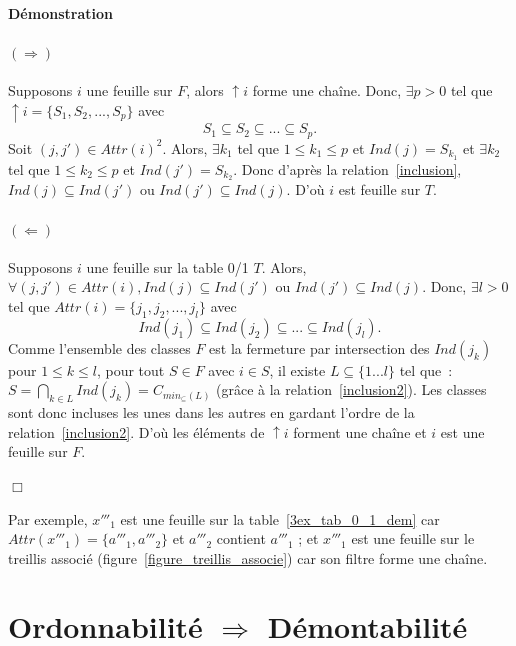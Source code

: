 \documentclass[a4paper]{report}
\renewcommand{\textbf}[1]{\begingroup\bfseries\mathversion{bold}#1\endgroup}
\newenvironment{preuve}{\textbf{Démonstration}}{}
\begin{document}
\begin{preuve}


\paragraph{$(\Rightarrow)$}
Supposons $i$ une feuille sur $F$, alors $\uparrow i$ forme une cha\^ine. 
Donc, $\exists p > 0$ tel que $\uparrow i = \{S_1, S_2,..., S_p\}$ avec
\begin{equation}
\label{inclusion}
 S_1 \subseteq S_2 \subseteq ... \subseteq S_p.
\end{equation}
Soit $(j, j') \in Attr(i)^2$. 
Alors,
$\exists k_1$ tel que  $1 \leqslant k_1 \leqslant p$ et $Ind(j) = S_{k_1}$
et
$\exists k_2$ tel que  $1 \leqslant k_2 \leqslant p$ et $Ind(j') = S_{k_2}$.
Donc d'après la relation~\ref{inclusion}, $Ind(j) \subseteq Ind(j')$ ou $Ind(j') \subseteq Ind(j)$. D'où $i$ est feuille sur $T$.

\paragraph{$(\Leftarrow)$}
Supposons $i$ une feuille sur la table 0/1 $T$. 
Alors, $\forall (j, j') \in Attr(i), Ind(j) \subseteq Ind(j')$ ou $Ind(j') \subseteq Ind(j)$. 
Donc, $\exists l > 0$ tel que $Attr(i) = \{j_1, j_2,..., j_l\}$  avec
\begin{equation}
\label{inclusion2}
 Ind(j_1) \subseteq Ind(j_2) \subseteq ... \subseteq Ind(j_l).
\end{equation}
Comme l'ensemble des classes $F$ est la fermeture par intersection 
des $Ind(j_k)$ pour $1 \leqslant k \leqslant l$, 
pour tout $S \in F$ avec $i \in S$, il existe $L \subseteq \{1...l\}$ tel que~:
 $S = \bigcap_{k \in L} Ind(j_k) = C_{min_{\subseteq}(L)}$ 
(grâce à la relation~\ref{inclusion2}). 
Les classes sont donc incluses les unes dans les autres en gardant l'ordre de la relation~\ref{inclusion2}.
D'où les éléments de $\uparrow i$ forment une cha\^ine et $i$ est une feuille sur $F$.

$\Box$
\end{preuve}

Par exemple, $x'''_1$ est une feuille sur la table~\ref{3ex_tab_0_1_dem} car $Attr(x'''_1) =\{a'''_1, a'''_2\}$ et  $a'''_2$ contient $a'''_1$ ; 
et $x'''_1$ est une feuille sur le treillis associé (figure~\ref{figure_treillis_associe}) car son filtre forme une chaîne.

\section{Ordonnabilité $\Rightarrow$ Démontabilité}
\end{document}

